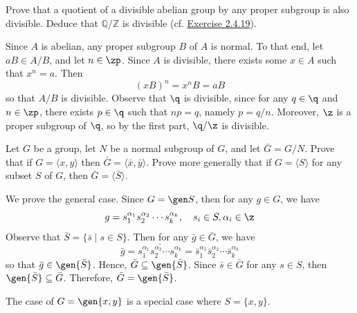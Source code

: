 \begin{exercise}\label{ex3.1.15}
    Prove that a quotient of a divisible abelian group by any proper subgroup is also divisible. Deduce that $\mathbb{Q}/\mathbb{Z}$ is divisible (cf. \hyperref[ex2.4.19]{Exercise 2.4.19}).
\end{exercise}

\begin{sol}
    Since $A$ is abelian, any proper subgroup $B$ of $A$ is normal. To that end, let $aB \in A/B$, and let $n \in \zp$. Since $A$ is divisible, there exists some $x \in A$ such that $x^n = a$. Then
    \[(xB)^n = x^n B = aB\]
    so that $A/B$ is divisible. Observe that $\q$ is divisible, since for any $q \in \q$ and $n \in \zp$, there exists $p \in \q$ such that $np = q$, namely $p = q/n$. Moreover, $\z$ is a proper subgroup of $\q$, so by the first part, $\q/\z$ is divisible.
\end{sol}

\begin{specialexercise}\label{ex3.1.16}
    Let $G$ be a group, let $N$ be a normal subgroup of $G$, and let $\bar{G} = G/N$. Prove that if $G = \langle x, y \rangle$ then $\bar{G} = \langle \bar{x}, \bar{y} \rangle$. Prove more generally that if $G = \langle S \rangle$ for any subset $S$ of $G$, then $\bar{G} = \langle \bar{S} \rangle$.
\end{specialexercise}

\begin{sol}
    We prove the general case. Since $G = \gen S$, then for any $g \in G$, we have
    \[g = s_1^{\alpha_1} s_2^{\alpha_2} \cdots s_k^{\alpha_k}, \quad s_i \in S, \alpha_i \in \z\]
    Observe that $\bar S = \{\bar s \mid s \in S\}$. Then for any $\bar g \in \bar G$, we have
    \[\bar g = \bar{s_1^{\alpha_1} s_2^{\alpha_2} \cdots s_k^{\alpha_k}} = \bar s_1^{\alpha_1} \bar s_2^{\alpha_2} \cdots \bar s_k^{\alpha_k}\]
    so that $\bar g \in \gen{\bar S}$. Hence, $\bar G \subseteq \gen{\bar S}$. Since $\bar s \in \bar G$ for any $s \in S$, then $\gen{\bar S} \subseteq \bar G$. Therefore, $\bar G = \gen{\bar S}$.

    The case of $G = \gen{x, y}$ is a special case where $S = \{x, y\}$.
\end{sol}

